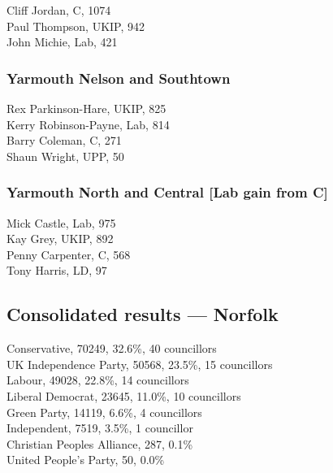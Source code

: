 \documentclass[a4paper,openany,10pt]{book}
\begin{document}


Cliff Jordan, C, 1074\\
Paul Thompson, UKIP, 942\\
John Michie, Lab, 421\\


\subsubsection*{Yarmouth Nelson and Southtown}



Rex Parkinson-Hare, UKIP, 825\\
Kerry Robinson-Payne, Lab, 814\\
Barry Coleman, C, 271\\
Shaun Wright, UPP, 50\\


\subsubsection*{Yarmouth North and Central \hspace*{\fill}\nolinebreak[1]%
\enspace\hspace*{\fill}
[Lab gain from C]}



Mick Castle, Lab, 975\\
Kay Grey, UKIP, 892\\
Penny Carpenter, C, 568\\
Tony Harris, LD, 97\\




\subsection*{Consolidated results --- Norfolk}
Conservative, 70249, 32.6\%, 40 councillors\\
UK Independence Party, 50568, 23.5\%, 15 councillors\\
Labour, 49028, 22.8\%, 14 councillors\\
Liberal Democrat, 23645, 11.0\%, 10 councillors\\
Green Party, 14119, 6.6\%, 4 councillors\\
Independent, 7519, 3.5\%, 1 councillor\\
Christian Peoples Alliance, 287, 0.1\% \\
United People's Party, 50, 0.0\% \\
\end{document}
